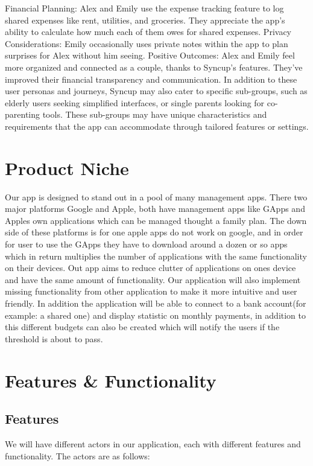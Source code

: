\documentclass[12pt]{article}
\begin{document}
Financial Planning:
Alex and Emily use the expense tracking feature to log shared expenses like rent, utilities, and groceries.
They appreciate the app's ability to calculate how much each of them owes for shared expenses.
Privacy Considerations:
Emily occasionally uses private notes within the app to plan surprises for Alex without him seeing.
Positive Outcomes:
Alex and Emily feel more organized and connected as a couple, thanks to Syncup's features.
They've improved their financial transparency and communication.
In addition to these user personas and journeys, Syncup may also cater to specific sub-groups, such as elderly users seeking simplified interfaces, or single parents looking for co-parenting tools. These sub-groups may have unique characteristics and requirements that the app can accommodate through tailored features or settings.

\pagebreak
\section{Product Niche}
Our app is designed to stand out in a pool of many management apps. There two major platforms Google and Apple, 
both have management apps like GApps and Apples own applications which can be managed thought a family plan. The down side of these
platforms is for one apple apps do not work on google, and in order for user to use the GApps they have to download around a dozen or
so apps which in return multiplies the number of applications with the same functionality on their devices. Out app aims to 
reduce clutter of applications on ones device and have the same amount of functionality. Our application will also implement missing functionality
from other application to make it more intuitive and user friendly. In addition the application will be able
to connect to a bank account(for example: a shared one) and display statistic on monthly payments, in addition to this different budgets 
can also be created which will notify the users if the threshold is about to pass. 

\pagebreak
\section{Features \& Functionality}

\subsection{Features}

We will have different actors in our application, each with different features and functionality. The actors are as follows:
\end{document}
